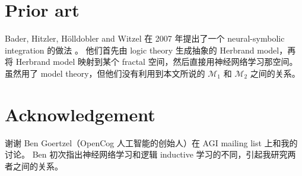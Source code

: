 \documentclass[orivec]{llncs}
\newcommand{\emp}[1]{\textbf{\textcolor{Cerulean}{#1}}}
\begin{document}

\section{Prior art}

Bader, Hitzler, H\"{o}lldobler and Witzel 在 2007 年提出了一个 neural-symbolic integration 的做法 \cite{Bader2007}。 他们首先由 logic theory 生成抽象的 Herbrand model，再将 Herbrand model 映射到某个 fractal 空间，然后直接用神经网络学习那空间。  虽然用了 model theory，但他们没有利用到本文所说的 $\mathcal{M}_1$ 和 $\mathcal{M}_2$ 之间的关系。 

\section*{Acknowledgement}

\footnotesize{谢谢 Ben Goertzel（OpenCog 人工智能的创始人）在 AGI mailing list 上和我的讨论。 Ben 初次指出神经网络学习和逻辑 inductive 学习的不同，引起我研究两者之间的关系。}

\end{document}
